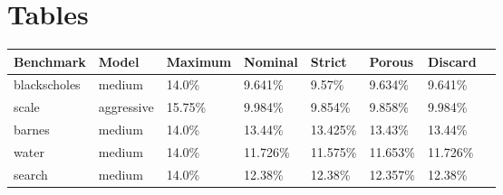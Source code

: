 \documentclass[11pt]{article}
\begin{document}
\section {Tables}
\begin{table}[H]
\begin{tabular}{l|lllllll}
Benchmark & Model & Maximum & Nominal & Strict & Porous & Discard &  \\
\hline
blackscholes & medium & 14.0\% & 9.641\% & 9.57\% & 9.634\% & 9.641\% & \\
scale & aggressive & 15.75\% & 9.984\% & 9.854\% & 9.858\% & 9.984\% & \\
barnes & medium & 14.0\% & 13.44\% & 13.425\% & 13.43\% & 13.44\% & \\
water & medium & 14.0\% & 11.726\% & 11.575\% & 11.653\% & 11.726\% & \\
search & medium & 14.0\% & 12.38\% & 12.38\% & 12.357\% & 12.38\% & \\

\end{tabular}
\end{table}
\end{document}
